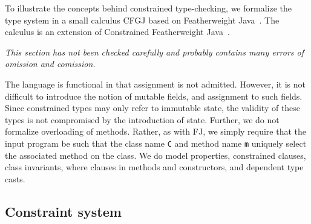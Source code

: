 \newcommand\EX[3]{{\tt(}{#2}\;{\tt :}\;{#1}{\tt)}\;{#3}}
\newcommand\EXT[2]{{\tt[}{#1}{\tt]}\;{#2}}
\newcommand\TY[2]{{#2}\;{\tt :}\;{#1}}
\newcommand\CAST[2]{{#2}~{\tt as}~{#1}}


\def\TConstr{\mbox{\sc T-Constr}}
\def\TInv{\mbox{\sc T-Inv}}
\def\TVar{\mbox{\sc T-Var}}
\def\TField{\mbox{\sc T-Field}}
\def\TInvk{\mbox{\sc T-Invk}}
\def\TNew{\mbox{\sc T-New}}
\def\TCast{\mbox{\sc T-Cast}}
\def\TUCast{\mbox{\sc T-UCast}}
\def\TDCast{\mbox{\sc T-DCast}}
\def\TSCast{\mbox{\sc T-SCast}}

\def\SRefl{\mbox{\sc S-Refl}}
\def\STrans{\mbox{\sc S-Trans}}
\def\SExtends{\mbox{\sc S-Extends}}
\def\SDep{\mbox{\sc S-Dep}}
\def\SC{\mbox{\sc S-Constraint}}

\def\RField{\mbox{\sc R-Field}}
\def\RCField{\mbox{\sc RC-Field}}
\def\RInvk{\mbox{\sc R-Invk}}
\def\RCInvkRecv{\mbox{\sc RC-Invk-Recv}}
\def\RCInvkArg{\mbox{\sc RC-Invk-Arg}}
\def\RCNewArg{\mbox{\sc RC-New-Arg}}
\def\RCast{\mbox{\sc R-Cast}}
\def\RCCast{\mbox{\sc RC-Cast}}

\newcommand\Xten{X10}
\newcommand\FJ{FJ}

To illustrate
the concepts behind constrained type-checking,
we formalize the type system in a small calculus CFGJ based on
Featherweight Java~\cite{FJ}.  The calculus is an extension of
Constrained Featherweight Java~\cite{constrained-types}.

\emph{This section has not been checked carefully and probably
contains many errors of omission and comission.}

The language is functional in that assignment is not
admitted. However, it is not difficult to introduce the notion of
mutable fields, and assignment to such fields. Since constrained types
may only refer to immutable state, the validity of these types is not
compromised by the introduction of state.
%
Further, we do not formalize overloading of methods. Rather, as
with \FJ{}, we simply require that the input program be such that the class
name {\tt C} and method name {\tt m} uniquely select the associated
method on the class. 
%
We do model properties, constrained clauses, class invariants, where
clauses in methods and constructors, and dependent type casts.

\subsection{Constraint system}

